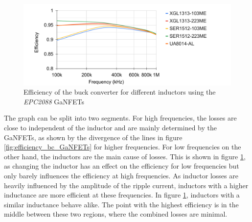 \begin{figure}[H]
    \centering
    \includegraphics[width=0.95\linewidth]{Bilder//Kapitel4/BC_Meas_Efficiency_Inductor_EPC2088.pdf}
    \caption{Efficiency of the buck converter for different inductors using the \textit{EPC2088} \acp{GaNFET}}
    \label{fig:efficiency_bc_inductors}
\end{figure}
The graph can be split into two segments. For high frequencies, the losses are close to independent of the inductor and are mainly determined by the \acp{GaNFET}, as shown by the divergence of the lines in figure \ref{fig:efficiency_bc_GaNFETs} for higher frequencies. For low frequencies on the other hand, the inductors are the main cause of losses. This is shown in figure \ref{fig:efficiency_bc_inductors}, as changing the inductor has an effect on the efficiency for low frequencies but only barely influences the efficiency at high frequencies. As inductor losses are heavily influenced by the amplitude of the ripple current, inductors with a higher inductance are more efficient at these frequencies. In figure \ref{fig:efficiency_bc_inductors}, inductors with a similar inductance behave alike. The point with the highest efficiency is in the middle between these two regions, where the combined losses are minimal.\\


